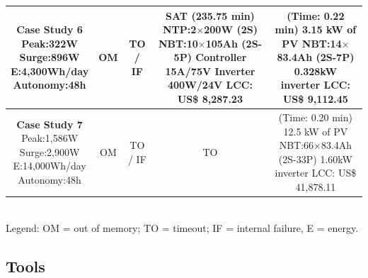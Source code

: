 \documentclass[review]{elsarticle}
\begin{document}
\begin{table}
\begin{scriptsize}
\begin{tabular}{|c|c|c|c|c|}
\makecell{\textbf{Case Study 6}\\Peak:322W\\Surge:896W\\E:4,300Wh/day\\Autonomy:48h} & OM & TO / IF & \makecell {SAT (235.75 min) \\NTP:2$\times$200W (2S)\\NBT:10$\times$105Ah (2S-5P)\\Controller 15A/75V\\Inverter 400W/24V \\LCC: US\$ 8,287.23} & \makecell{(Time: 0.22 min)\\3.15 kW of PV\\NBT:14$\times$83.4Ah (2S-7P)\\0.328kW inverter\\LCC: US\$ 9,112.45} \\
\hline
\makecell{\textbf{Case Study 7}\\Peak:1,586W\\Surge:2,900W\\E:14,000Wh/day\\Autonomy:48h} & OM & TO / IF & TO & \makecell{(Time: 0.20 min)\\12.5 kW of PV\\NBT:66$\times$83.4Ah (2S-33P)\\1.60kW inverter\\LCC: US\$ 41,878.11} \\
\hline
\hline
\end{tabular}
\\Legend: OM = out of memory; TO = timeout; IF = internal failure, E = energy.
\end{scriptsize}
\end{table}


\subsection{Tools} 
\end{document}
